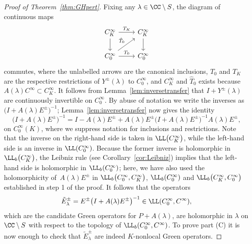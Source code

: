 \begin{proof}[Proof of Theorem~\ref{thm:GHpert}]
 	Fixing any $\lambda\in \CC\setminus S$, the diagram of continuous maps
 	\begin{equation*}
 		\begin{tikzcd}
 			C^\infty_K \arrow[r, "T_K"]\arrow[d] & C^\infty_K \arrow[d]\\
 			C_0^\infty \arrow[r, "T_0"]\arrow[ur,"\hat{T}_0"] & C_0^\infty
 		\end{tikzcd}
 	\end{equation*}
 	commutes, where the unlabelled arrows are the canonical inclusions,
 	$T_0$ and $T_K$ are the respective restrictions of $Y^\pm(\lambda)$
 	to $C_0^\infty$, and $C_K^\infty$ and $\hat{T}_0$ exists because
 	$A(\lambda)C^\infty\subset C^\infty_K$.
 	It follows from Lemma~\ref{lem:inversetransfer} that $I+ Y^\pm(\lambda)$ are continuously invertible on $C_0^\infty$. By abuse of notation we write the inverses as $\big(I+ A(\lambda)E^\pm\big)^{-1}$; Lemma~\ref{lem:inversetransfer} now gives the identity
 	\begin{equation}\label{eq:inverseidentity}
 		\big(I+ A(\lambda)E^\pm\big)^{-1} = I - A(\lambda)E^\pm + A(\lambda)E^\pm \big(I+ A(\lambda)E^\pm\big)^{-1} A(\lambda)E^\pm,
 	\end{equation}
 	on $C_0^\infty(K)$, where we suppress notation for inclusions and restrictions. Note that the inverse on the right-hand side is taken in $\LL\big(C^\infty_K\big)$, while the left-hand side is an inverse in $\LL(C^\infty_0)$. Because the former inverse is holomorphic in
 	$\LL_b\big(C^\infty_K\big)$, the Leibniz rule (see Corollary~\ref{cor:Leibniz}) implies that the left-hand side is
 	holomorphic in $\LL_b(C_0^\infty)$; here, we have also used the holomorphicity
 	of~$A(\lambda)E^\pm$ in $\LL_b\big(C_0^\infty,C^\infty_K\big)$, $\LL_b(C_0^\infty)$ and $\LL_b\big(C^\infty_K,C_0^\infty\big)$ established in step 1 of the proof. It follows that the operators
 	\begin{equation*}
 		\tilde{E}^\pm_\lambda= E^\pm \big(I+ A(\lambda)E^\pm\big)^{-1}\in\LL(C_0^\infty, C^\infty),
 	\end{equation*}
 	which are the candidate Green operators for $P+A(\lambda)$,	are holomorphic in $\lambda$ on $\CC\setminus S$ with respect to the topology of $\LL_b(C_0^\infty,C^\infty)$.
 	To prove part (C) it is now enough to check that $\tilde{E}^\pm_\lambda$ are indeed $K$-nonlocal Green operators.
 	

\end{proof}
